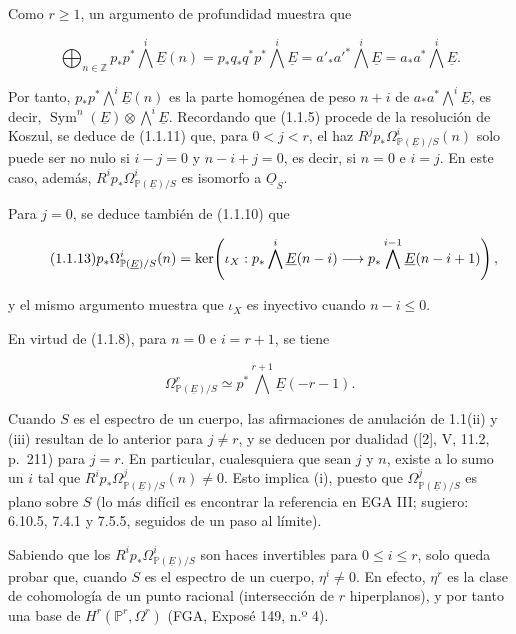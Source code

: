 Como $r\geq1$, un argumento de profundidad muestra que

\begin{equation}\tag{1.1.12}
\bigoplus_{n\in\mathbb Z}p_*p^*\bigwedge^i\underline E(n)
=p_*q_*q^*p^*\bigwedge^i\underline E
={a'}_*{a'}^*\bigwedge^i\underline E
=a_*a^*\bigwedge^i\underline E.
\end{equation}

\pageoriginale

Por tanto, $p_*p^*\bigwedge^i\underline E(n)$ es la parte homogénea de peso
$n+i$ de $a_*a^*\bigwedge^i\underline E$, es decir,
$\operatorname{Sym}^n(\underline E)\otimes\bigwedge^i\underline E$.
Recordando que (1.1.5) procede de la resolución de Koszul, se deduce de
(1.1.11) que, para $0<j<r$, el haz
$R^jp_*\Omega^i_{\mathbb P(\underline E)/S}(n)$ solo puede ser no nulo si
$i-j=0$ y $n-i+j=0$, es decir, si $n=0$ e $i=j$. En este caso, además,
$R^ip_*\Omega^i_{\mathbb P(\underline E)/S}$ es isomorfo a
$\underline O_S$.

Para $j=0$, se deduce también de (1.1.10) que

\begin{equation}\tag{1.1.13}
p_*\Omega^i_{\mathbb P(\underline E)/S}(n)
=\ker\!\left(\iota_X:
p_*\bigwedge^i\underline E(n-i)\longrightarrow
p_*\bigwedge^{i-1}\underline E(n-i+1)\sisi{\right.}{\right)},
\end{equation}

y el mismo argumento muestra que $\iota_X$ es inyectivo cuando $n-i\leq0$.

En virtud de (1.1.8), para $n=0$ e $i=r+1$, se tiene

\begin{equation*}
\Omega^r_{\mathbb P(\underline E)/S}\simeq
p^*\bigwedge^{r+1}\underline E(-r-1).
\end{equation*}

Cuando $S$ es el espectro de un cuerpo, las afirmaciones de anulación de
1.1(ii) y (iii) resultan de lo anterior para $j\ne r$, y se deducen por
dualidad ([2], V, 11.2, p.~211) para $j=r$. En particular, cualesquiera que
sean $j$ y $n$, existe a lo sumo un $i$ tal que
$R^ip_*\Omega^j_{\mathbb P(\underline E)/S}(n)\ne0$. Esto implica (i),
puesto que $\Omega^j_{\mathbb P(\underline E)/S}$ es plano sobre $S$ (lo
más difícil es encontrar la referencia en EGA III; sugiero: 6.10.5,
7.4.1 y 7.5.5, seguidos de un paso al límite).

Sabiendo que los $R^ip_*\Omega^i_{\mathbb P(\underline E)/S}$ son haces
invertibles para $0\leq i\leq r$, solo queda probar que, cuando $S$ es el
espectro de un cuerpo, $\eta^i\ne0$. En efecto, $\eta^r$ es la clase de
cohomología de un punto racional (intersección de $r$ hiperplanos), y por
tanto una base de $H^r(\mathbb P^r,\Omega^r)$ (FGA, Exposé 149, n.º 4).

